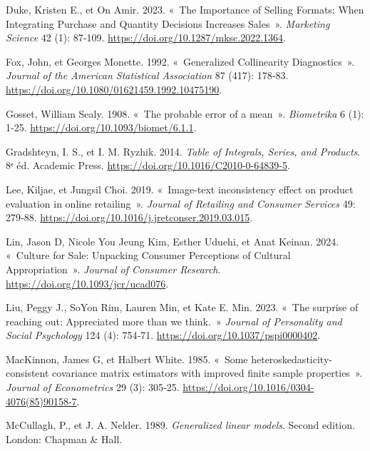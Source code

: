 \documentclass[
  11pt,
  letterpaper,
]{scrbook}
\newlength{\cslhangindent}
\newenvironment{CSLReferences}[2] %
 {\begin{list}{}{%
  \setlength{\itemindent}{0pt}
  \setlength{\leftmargin}{0pt}
  \setlength{\parsep}{0pt}
  \ifodd #1
   \setlength{\leftmargin}{\cslhangindent}
   \setlength{\itemindent}{-1\cslhangindent}
  \fi
  \setlength{\itemsep}{#2\baselineskip}}}
 {\end{list}}
\theoremstyle{definition}
\theoremstyle{plain}
\theoremstyle{definition}
\theoremstyle{plain}
\theoremstyle{remark}
\begin{document}
\begin{CSLReferences}{1}{0}
Duke, Kristen E., et On Amir. 2023. {«~The Importance of Selling
Formats: When Integrating Purchase and Quantity Decisions Increases
Sales~»}. \emph{Marketing Science} 42 (1): 87‑109.
\url{https://doi.org/10.1287/mksc.2022.1364}.

Fox, John, et Georges Monette. 1992. {«~Generalized Collinearity
Diagnostics~»}. \emph{Journal of the American Statistical Association}
87 (417): 178‑83. \url{https://doi.org/10.1080/01621459.1992.10475190}.

Gosset, William Sealy. 1908. {«~The probable error of a mean~»}.
\emph{Biometrika} 6 (1): 1‑25.
\url{https://doi.org/10.1093/biomet/6.1.1}.

Gradshteyn, I. S., et I. M. Ryzhik. 2014. \emph{Table of Integrals,
Series, and Products}. 8ᵉ éd. Academic Press.
\url{https://doi.org/10.1016/C2010-0-64839-5}.

Lee, Kiljae, et Jungsil Choi. 2019. {«~Image-text inconsistency effect
on product evaluation in online retailing~»}. \emph{Journal of Retailing
and Consumer Services} 49: 279‑88.
\url{https://doi.org/10.1016/j.jretconser.2019.03.015}.

Lin, Jason D, Nicole You Jeung Kim, Esther Uduehi, et Anat Keinan. 2024.
{«~Culture for Sale: Unpacking Consumer Perceptions of Cultural
Appropriation~»}. \emph{Journal of Consumer Research}.
\url{https://doi.org/10.1093/jcr/ucad076}.

Liu, Peggy J., SoYon Rim, Lauren Min, et Kate E. Min. 2023. {«~The
surprise of reaching out: Appreciated more than we think.~»}
\emph{Journal of Personality and Social Psychology} 124 (4): 754‑71.
\url{https://doi.org/10.1037/pspi0000402}.

MacKinnon, James G, et Halbert White. 1985. {«~Some
heteroskedasticity-consistent covariance matrix estimators with improved
finite sample properties~»}. \emph{Journal of Econometrics} 29 (3):
305‑25. \url{https://doi.org/10.1016/0304-4076(85)90158-7}.

McCullagh, P., et J. A. Nelder. 1989. \emph{Generalized linear models}.
{S}econd edition. London: Chapman \& Hall.


\end{CSLReferences}
\end{document}
